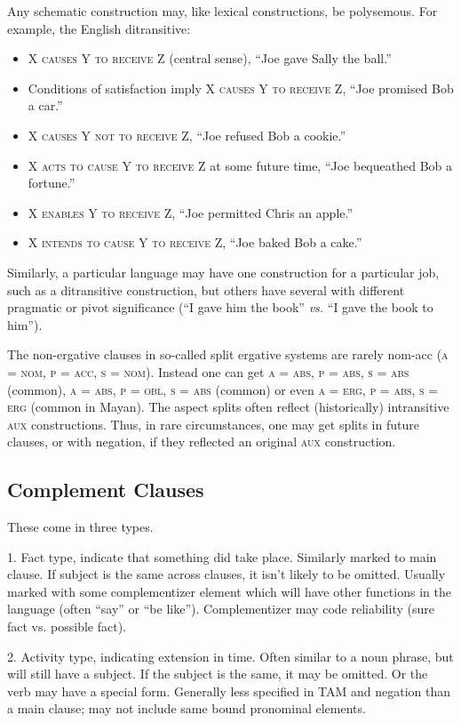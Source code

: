 \documentclass[11pt]{article}
\newcommand{\I}[1]{\textsc{#1}}   %
\newenvironment{grammarlist}%
 {\begin{itemize}\addtolength{\itemsep}{-0.5\baselineskip}\ignorespaces}%
 {\end{itemize}\ignorespacesafterend}
\begin{document}
Any schematic construction may, like lexical constructions, be
polysemous.  For example, the English ditransitive:

\begin{grammarlist}
  \item \I{X causes Y to receive Z} (central sense), ``Joe gave Sally
    the ball.''
  \item Conditions of satisfaction imply \I{X causes Y to receive Z},
    ``Joe promised Bob a car.''
  \item \I{X causes Y not to receive Z}, ``Joe refused Bob a cookie.''
  \item \I{X acts to cause Y to receive Z} at some future time, ``Joe
    bequeathed Bob a fortune.''
  \item \I{X enables Y to receive Z}, ``Joe permitted Chris an
    apple.''
  \item \I{X intends to cause Y to receive Z}, ``Joe baked Bob a cake.''
\end{grammarlist}

Similarly, a particular language may have one construction for a
particular job, such as a ditransitive construction, but others have
several with different pragmatic or pivot significance (``I gave him
the book'' \textit{vs.} ``I gave the book to him'').

The non-ergative clauses in so-called split ergative systems are
rarely nom-acc (\I{a = nom, p = acc, s = nom}).  Instead one can get
\I{a = abs, p = abs, s = abs} (common), \I{a = abs, p = obl, s = abs}
(common) or even \I{a = erg, p = abs, s = erg} (common in Mayan).  The
aspect splits often reflect (historically) intransitive \I{aux}
constructions.  Thus, in rare circumstances, one may get splits in
future clauses, or with negation, if they reflected an original
\I{aux} construction.

\subsection*{Complement Clauses}
These come in three types.

1.  Fact type, indicate that something did take place.  Similarly
marked to main clause.  If subject is the same across clauses, it
isn't likely to be omitted.  Usually marked with some complementizer
element which will have other functions in the language (often ``say''
or ``be like'').  Complementizer may code reliability (sure fact
vs. possible fact).

2. Activity type, indicating extension in time.  Often similar to a
noun phrase, but will still have a subject.  If the subject is the
same, it may be omitted.  Or the verb may have a special form.
Generally less specified in TAM and negation than a main clause; may
not include same bound pronominal elements.
\end{document}
